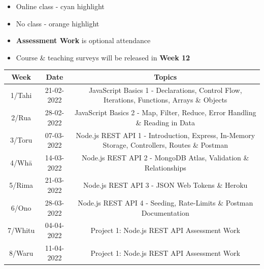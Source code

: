 \documentclass{article}
\begin{document}
\begin{itemize}
	\item Online class - cyan highlight 
	\item No class - orange highlight
	\item \textbf{Assessment Work} is optional attendance
	\item Course \& teaching surveys will be released in \textbf{Week 12}
\end{itemize}

\renewcommand{\arraystretch}{1.5}
\begin{tabular}{|c|c|c|c|}
	\hline
	\textbf{Week}                  & \textbf{Date}            & \multicolumn{2}{c|}{\textbf{Topics}}                                                                                             \\ \hline
	\footnotesize 1/Tahi           & \footnotesize 21-02-2022 & \multicolumn{2}{c|}{\footnotesize JavaScript Basics 1 - Declarations, Control Flow, Iterations, Functions, Arrays \& Objects}    \\ \hline
	\footnotesize 2/Rua            & \footnotesize 28-02-2022 & \multicolumn{2}{c|}{\cellcolor{cyan} \footnotesize JavaScript Basics 2 - Map, Filter, Reduce, Error Handling \& Reading in Data}                  \\ \hline
	\footnotesize 3/Toru           & \footnotesize 07-03-2022 & \multicolumn{2}{c|}{\footnotesize Node.js REST API 1 - Introduction, Express, In-Memory Storage, Controllers, Routes \& Postman} \\ \hline
	\footnotesize 4/Whā            & \footnotesize 14-03-2022 & \multicolumn{2}{c|}{\footnotesize Node.js REST API 2 - MongoDB Atlas, Validation \& Relationships}                               \\ \hline
	\footnotesize 5/Rima           & \footnotesize 21-03-2022 & \multicolumn{2}{c|}{\footnotesize Node.js REST API 3 - JSON Web Tokens \& Heroku}                                                \\ \hline
	\footnotesize 6/Ono            & \footnotesize 28-03-2022 &  \multicolumn{2}{c|}{\cellcolor{orange} \footnotesize Node.js REST API 4 - Seeding, Rate-Limits \& Postman Documentation}                            \\ \hline
	\footnotesize 7/Whitu          & \footnotesize 04-04-2022 & \multicolumn{2}{c|}{\footnotesize Project 1: Node.js REST API Assessment Work}                                                   \\ \hline
	\footnotesize 8/Waru           & \footnotesize 11-04-2022 & \multicolumn{2}{c|}{\footnotesize Project 1: Node.js REST API Assessment Work}                                                   \\ \hline

\end{tabular}
\end{document}

